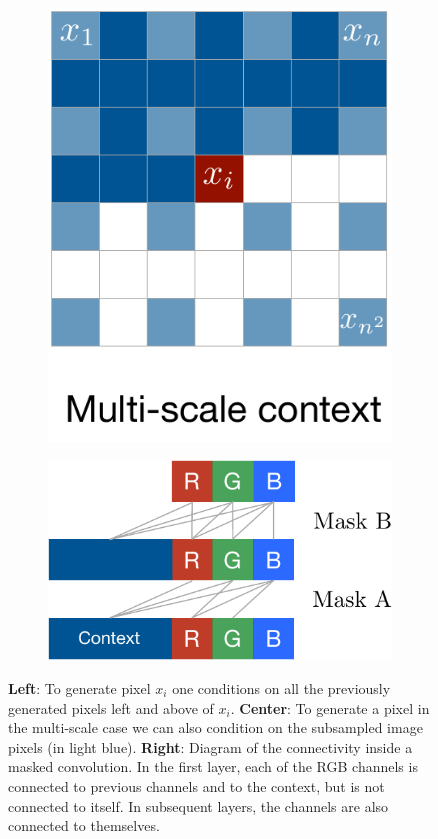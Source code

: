 \begin{figure}[h]
\begin{subfigure}{.14\textwidth}
	\includegraphics[width=\textwidth]{multiscalecontext.pdf}
\end{subfigure}
\hfill
\begin{subfigure}{.16\textwidth}
	\includegraphics[width=\textwidth]{rgb3.pdf}
\end{subfigure}
\hfill
\caption{\textbf{Left}: To generate pixel $x_i$ one conditions on all the previously generated pixels left and above of $x_i$. \textbf{Center}: To generate a pixel in the multi-scale case we can also condition on the subsampled image pixels (in light blue). \textbf{Right}: Diagram of the connectivity inside a masked convolution. In the first layer, each of the RGB channels is connected to previous channels and to the context, but is not connected to itself. In subsequent layers, the channels are also connected to themselves.}
\vspace{-0.2cm}
\label{depen}

\end{figure}

